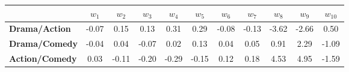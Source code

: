\begin{tabular}{|l|c|c|c|c|c|c|c|c|c|c|}
\hline
&\textbf{$w_{1}$}&\textbf{$w_{2}$}&\textbf{$w_{3}$}&\textbf{$w_{4}$}&\textbf{$w_{5}$}&\textbf{$w_{6}$}&\textbf{$w_{7}$}&\textbf{$w_{8}$}&\textbf{$w_{9}$}&\textbf{$w_{10}$}\\\hline
\textbf{Drama/Action}&-0.07&0.15&0.13&0.31&0.29&-0.08&-0.13&-3.62&-2.66&0.50\\\hline
\textbf{Drama/Comedy}&-0.04&0.04&-0.07&0.02&0.13&0.04&0.05&0.91&2.29&-1.09\\\hline
\textbf{Action/Comedy}&0.03&-0.11&-0.20&-0.29&-0.15&0.12&0.18&4.53&4.95&-1.59\\\hline
\end{tabular}
